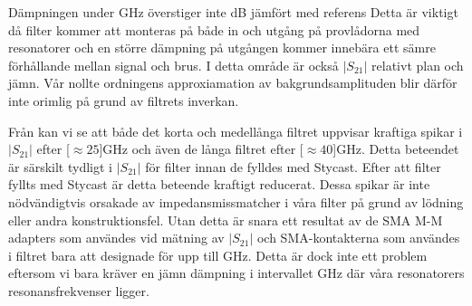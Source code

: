 \documentclass[main.tex]{subfiles}
\begin{document}
Dämpningen under \unit[10]{GHz} överstiger inte \unit[3]{dB} jämfört med referens Detta är viktigt då filter kommer att monteras på både in och utgång på provlådorna med resonatorer och en större dämpning på utgången kommer innebära ett sämre förhållande mellan signal och brus. I detta område är också $|S_{21}|$ relativt plan och jämn. Vår nollte ordningens approxiamation av bakgrundsamplituden blir därför inte orimlig på grund av filtrets inverkan.

Från  kan vi se att både det korta och medellånga filtret uppvisar kraftiga spikar i $|S_{21}|$ efter \unit[$\approx 25$]{GHz} och även de långa filtret efter \unit[$\approx 40$]{GHz}. Detta beteendet är särskilt tydligt i $|S_{21}|$ för filter innan de fylldes med Stycast. Efter att filter fyllts med Stycast är detta beteende kraftigt reducerat. Dessa spikar är inte nödvändigtvis orsakade av impedansmissmatcher i våra filter på grund av lödning eller andra konstruktionsfel. Utan detta är snara ett resultat av de SMA M-M adapters som användes vid mätning av $|S_{21}|$ och SMA-kontakterna som användes i filtret bara att designade för upp till \unit[18]{GHz}. Detta är dock inte ett problem eftersom vi bara kräver en jämn dämpning i intervallet \unit[4-8]{GHz} där våra resonatorers resonansfrekvenser ligger.
\end{document}
